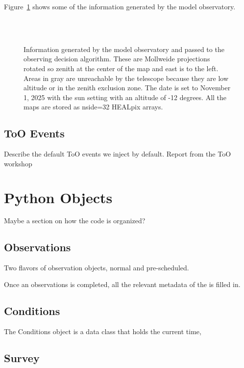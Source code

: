 \documentclass[]{aastex631}
\begin{document}
Figure~\ref{fig:conditions} shows some of the information generated by the model observatory. 

\begin{figure}
     \\
     \\
    \caption{Information generated by the model observatory and passed to the observing decision algorithm. These are Mollweide projections rotated so zenith at the center of the map and east is to the left. Areas in gray are unreachable by the telescope because they are low altitude or in the zenith exclusion zone. The date is set to November 1, 2025 with the sun setting with an altitude of -12 degrees. All the maps are stored as nside=32 HEALpix arrays. }
    \label{fig:conditions}
\end{figure}

\subsection{ToO Events}

Describe the default ToO events we inject by default. Report from the ToO workshop \citep{Andreoni2022}

\section{Python Objects}
Maybe a section on how the code is organized? 

\subsection{Observations}

Two flavors of observation objects, normal and pre-scheduled. 

Once an observations is completed, all the relevant metadata of the is filled in.

\subsection{Conditions}

The Conditions object is a data class that holds the current time, 

\subsection{Survey}
\end{document}
